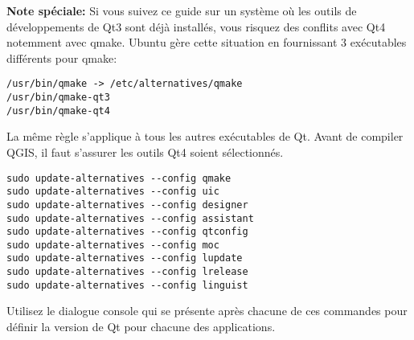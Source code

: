 \textbf{Note sp\'eciale:} Si vous suivez ce guide sur un syst\`eme o\`u les outils de d\'eveloppements de Qt3 sont d\'ej\`a install\'es, vous risquez des conflits avec Qt4 notemment avec qmake. Ubuntu g\`ere cette situation en fournissant 3 ex\'ecutables diff\'erents pour qmake:

\begin{verbatim}
/usr/bin/qmake -> /etc/alternatives/qmake 
/usr/bin/qmake-qt3
/usr/bin/qmake-qt4 
\end{verbatim}

La m\^eme r\`egle s'applique \`a tous les autres ex\'ecutables de Qt. Avant de compiler QGIS, il faut s'assurer les outils Qt4 soient s\'electionn\'es.

\begin{verbatim}
sudo update-alternatives --config qmake
sudo update-alternatives --config uic 
sudo update-alternatives --config designer 
sudo update-alternatives --config assistant 
sudo update-alternatives --config qtconfig 
sudo update-alternatives --config moc 
sudo update-alternatives --config lupdate 
sudo update-alternatives --config lrelease 
sudo update-alternatives --config linguist 
\end{verbatim}

Utilisez le dialogue console qui se pr\'esente apr\`es chacune de ces commandes pour d\'efinir la version de Qt pour chacune des applications.

% 
% 
% 
% 

